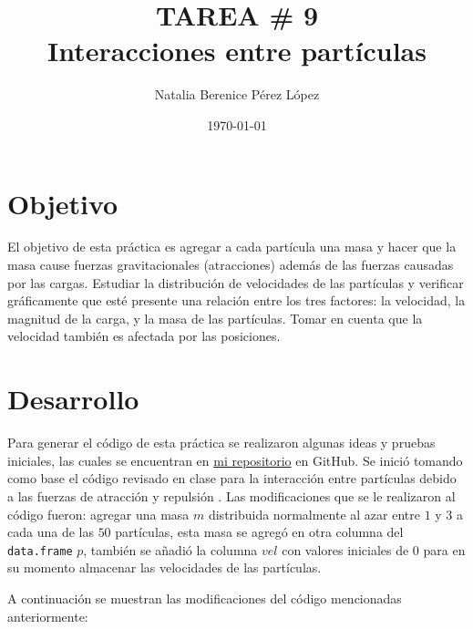 \documentclass{article}
\title{TAREA \# 9 \\ Interacciones entre partículas} %
\author{Natalia Berenice P\'{e}rez L\'{o}pez} %
\date{\today}
\begin{document}

\maketitle %

\section{Objetivo}
El objetivo de esta práctica es agregar a cada partícula una masa y hacer que la masa cause fuerzas gravitacionales (atracciones) además de las fuerzas causadas por las cargas. Estudiar la distribución de velocidades de las partículas y verificar gráficamente que esté presente una relación entre los tres factores: la velocidad, la magnitud de la carga, y la masa de las partículas. Tomar en cuenta que la velocidad también es afectada por las posiciones.

\section{Desarrollo} %
Para generar el código de esta práctica se realizaron algunas ideas y pruebas iniciales, las cuales se encuentran en \href{https://github.com/nataliaperez0/Simulation/tree/main/Tarea9}{mi repositorio}  en GitHub. Se inició tomando como base el código revisado en clase para la interacción entre partículas debido a las fuerzas de atracción y repulsión \citep{1}. Las modificaciones que se le realizaron al código fueron: agregar una masa $m$ distribuida normalmente al azar entre $1$ y $3$ a cada una de las $50$ partículas, esta masa se agregó en otra columna del \texttt{data.frame} $p$, también se añadió la columna $vel$ con valores iniciales de $0$ para en su momento almacenar las velocidades de las partículas.
\bigskip

A continuación se muestran las modificaciones del código mencionadas anteriormente:


\end{document}
